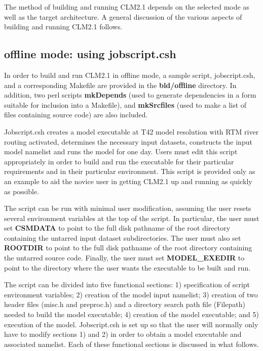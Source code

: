 The method of building and running CLM2.1 depends on the selected mode
as well as the target architecture.  A general discussion of the
various aspects of building and running CLM2.1 follows.

\subsection {offline mode: using jobscript.csh}

In order to build and run CLM2.1 in offline mode, a sample script,
jobscript.csh, and a corresponding Makefile are provided in the {\bf
bld/offline} directory. In addition, two perl scripts {\bf mkDepends}
(used to generate dependencies in a form suitable for inclusion into a
Makefile), and {\bf mkSrcfiles} (used to make a list of files
containing source code) are also included.

Jobscript.csh creates a model executable at T42 model resolution with
RTM river routing activated, determines the necessary input datasets,
constructs the input model namelist and runs the model for one day.
Users must edit this script appropriately in order to build and run
the executable for their particular requirements and in their
particular environment. This script is provided only as an example to
aid the novice user in getting CLM2.1 up and running as quickly as
possible.

The script can be run with minimal user modification, assuming the
user resets several environment variables at the top of the script.
In particular, the user must set {\bf CSMDATA} to point to the full
disk pathname of the root directory containing the untarred input
dataset subdirectories.  The user must also set {\bf ROOTDIR} to point
to the full disk pathname of the root directory containing the
untarred source code.  Finally, the user must set {\bf MODEL\_EXEDIR}
to point to the directory where the user wants the executable to be
built and run.

The script can be divided into five functional sections: 1)
specification of script environment variables; 2) creation of the
model input namelist; 3) creation of two header files (misc.h and
preproc.h) and a directory search path file (Filepath) needed to build
the model executable; 4) creation of the model executable; and 5)
execution of the model. Jobscript.csh is set up so that the user will
normally only have to modify sections 1) and 2) in order to obtain a
model executable and associated namelist.  Each of these functional
sections is discussed in what follows.

